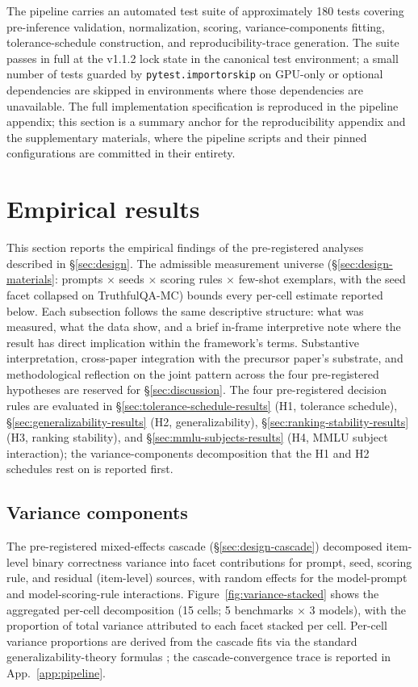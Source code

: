 \documentclass[11pt]{article}
\begin{document}
The pipeline carries an automated test suite of approximately 180
tests covering pre-inference validation, normalization, scoring,
variance-components fitting, tolerance-schedule construction, and
reproducibility-trace generation. The suite passes in full at the
v1.1.2 lock state in the canonical test environment; a small number
of tests guarded by \texttt{pytest.importorskip} on GPU-only or
optional dependencies are skipped in environments where those
dependencies are unavailable. The full implementation specification
is reproduced in the pipeline appendix; this section is a summary
anchor for the reproducibility appendix and the supplementary
materials, where the pipeline scripts and their pinned configurations
are committed in their entirety.

\section{Empirical results}
\label{sec:results}


This section reports the empirical findings of the pre-registered analyses described in §\ref{sec:design}. The admissible measurement universe (§\ref{sec:design-materials}: prompts $\times$ seeds $\times$ scoring rules $\times$ few-shot exemplars, with the seed facet collapsed on TruthfulQA-MC) bounds every per-cell estimate reported below. Each subsection follows the same descriptive structure: what was measured, what the data show, and a brief in-frame interpretive note where the result has direct implication within the framework's terms. Substantive interpretation, cross-paper integration with the precursor paper's substrate, and methodological reflection on the joint pattern across the four pre-registered hypotheses are reserved for §\ref{sec:discussion}. The four pre-registered decision rules are evaluated in §\ref{sec:tolerance-schedule-results} (H1, tolerance schedule), §\ref{sec:generalizability-results} (H2, generalizability), §\ref{sec:ranking-stability-results} (H3, ranking stability), and §\ref{sec:mmlu-subjects-results} (H4, MMLU subject interaction); the variance-components decomposition that the H1 and H2 schedules rest on is reported first.

\subsection{Variance components}
\label{sec:variance-components-results}

The pre-registered mixed-effects cascade (§\ref{sec:design-cascade}) decomposed item-level binary correctness variance into facet contributions for prompt, seed, scoring rule, and residual (item-level) sources, with random effects for the model-prompt and model-scoring-rule interactions. Figure~\ref{fig:variance-stacked} shows the aggregated per-cell decomposition (15 cells; 5 benchmarks $\times$ 3 models), with the proportion of total variance attributed to each facet stacked per cell. Per-cell variance proportions are derived from the cascade fits via the standard generalizability-theory formulas \citep{brennan2001gtheory, shrout1979icc}; the cascade-convergence trace is reported in App.~\ref{app:pipeline}.
\end{document}
